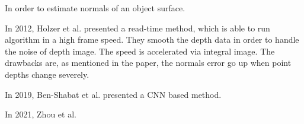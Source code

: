

In order to estimate normals of an object surface.

In 2012, Holzer et al. \cite{Holzer.S} presented a read-time method, which is able to run algorithm in a high frame speed. They smooth the depth data in order to handle the noise of depth image. The speed is accelerated via integral image. The drawbacks are, as mentioned in the paper, the normals error go up when point depths change severely.

In 2019, Ben-Shabat et al. \cite{Ben-Shabat_2019_CVPR} presented a CNN based method.


In 2021, Zhou et al.  \cite{zhou2021fast}



